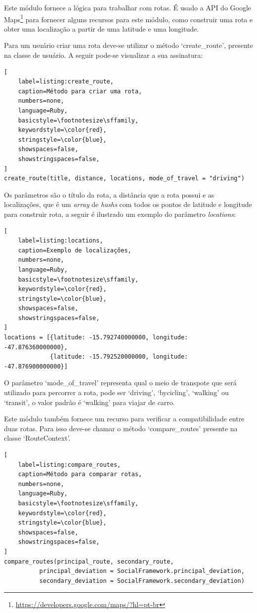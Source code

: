 Este módulo fornece a lógica para trabalhar com rotas. É usado a API do Google Maps\footnote{\url{https://developers.google.com/maps/?hl=pt-br}} para fornecer alguns recursos para este módulo, como construir uma rota e obter uma localização a partir de uma latitude e uma longitude.

Para um usuário criar uma rota deve-se utilizar o método `create\_route', presente na classe de usuário. A seguir pode-se visualizar a sua assinatura:

\begin{lstlisting}[
    label=listing:create_route,
    caption=Método para criar uma rota,
    numbers=none,
    language=Ruby,
    basicstyle=\footnotesize\sffamily,
    keywordstyle=\color{red},
    stringstyle=\color{blue},
    showspaces=false,
    showstringspaces=false,
]
create_route(title, distance, locations, mode_of_travel = "driving")
\end{lstlisting}


Os parâmetros são o título da rota, a distância que a rota possui e as localizações, que é um \textit{array} de \textit{hashs} com todos os pontos de latitude e longitude para construir rota, a seguir é ilustrado um exemplo do parâmetro \textit{locations}:

\begin{lstlisting}[
    label=listing:locations,
    caption=Exemplo de localizações,
    numbers=none,
    language=Ruby,
    basicstyle=\footnotesize\sffamily,
    keywordstyle=\color{red},
    stringstyle=\color{blue},
    showspaces=false,
    showstringspaces=false,
]
locations = [{latitude: -15.792740000000, longitude: -47.876360000000},
             {latitude: -15.792520000000, longitude: -47.876900000000}]
\end{lstlisting}

O parâmetro `mode\_of\_travel'  representa qual o meio de transpote que será utilizado para percorrer a rota, pode ser `driving', `bycicling', `walking' ou `transit', o valor padrão é `walking' para viajar de carro.

Este módulo também fornece um recurso para verificar a compatibilidade entre duas rotas. Para isso deve-se chamar o método `compare\_routes' presente na classe `RouteContext'.

\begin{lstlisting}[
    label=listing:compare_routes,
    caption=Método para comparar rotas,
    numbers=none,
    language=Ruby,
    basicstyle=\footnotesize\sffamily,
    keywordstyle=\color{red},
    stringstyle=\color{blue},
    showspaces=false,
    showstringspaces=false,
]
compare_routes(principal_route, secondary_route,
          principal_deviation = SocialFramework.principal_deviation,
          secondary_deviation = SocialFramework.secondary_deviation)
\end{lstlisting}

